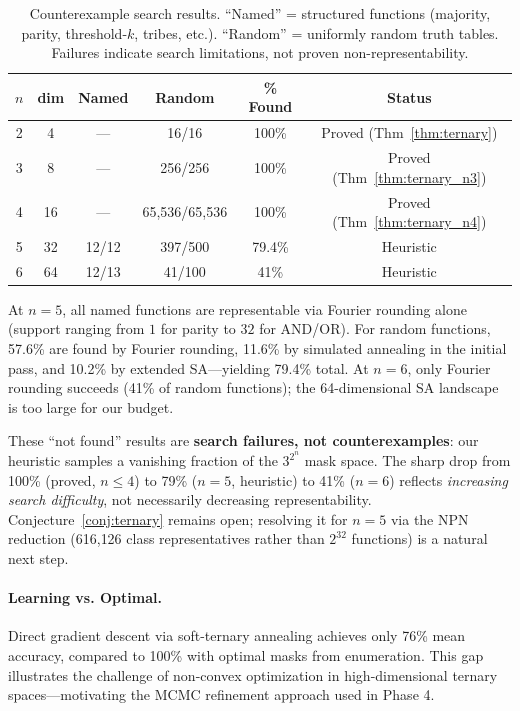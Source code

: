 \documentclass[Royal,times,sageh]{sagej}
\begin{document}
\begin{table}[h]
\centering
\caption{Counterexample search results. ``Named'' = structured functions (majority, parity, threshold-$k$, tribes, etc.). ``Random'' = uniformly random truth tables. Failures indicate search limitations, not proven non-representability.}
\label{tab:counterexample}
\small
\begin{tabular}{cccccc}
\toprule
$n$ & dim & Named & Random & \% Found & Status \\
\midrule
2 & 4 & --- & 16/16 & 100\% & Proved (Thm~\ref{thm:ternary}) \\
3 & 8 & --- & 256/256 & 100\% & Proved (Thm~\ref{thm:ternary_n3}) \\
4 & 16 & --- & 65{,}536/65{,}536 & 100\% & Proved (Thm~\ref{thm:ternary_n4}) \\
5 & 32 & 12/12 & 397/500 & 79.4\% & Heuristic \\
6 & 64 & 12/13 & 41/100 & 41\% & Heuristic \\
\bottomrule
\end{tabular}
\end{table}

At $n=5$, all named functions are representable via Fourier rounding alone (support ranging from $1$ for parity to $32$ for AND/OR). For random functions, 57.6\% are found by Fourier rounding, 11.6\% by simulated annealing in the initial pass, and 10.2\% by extended SA---yielding 79.4\% total. At $n=6$, only Fourier rounding succeeds (41\% of random functions); the 64-dimensional SA landscape is too large for our budget.

These ``not found'' results are \textbf{search failures, not counterexamples}: our heuristic samples a vanishing fraction of the $3^{2^n}$ mask space. The sharp drop from 100\% (proved, $n \leq 4$) to 79\% ($n=5$, heuristic) to 41\% ($n=6$) reflects \emph{increasing search difficulty}, not necessarily decreasing representability. Conjecture~\ref{conj:ternary} remains open; resolving it for $n=5$ via the NPN reduction (616{,}126 class representatives rather than $2^{32}$ functions) is a natural next step.

\paragraph{Learning vs. Optimal.}
Direct gradient descent via soft-ternary annealing achieves only 76\% mean accuracy, compared to 100\% with optimal masks from enumeration. This gap illustrates the challenge of non-convex optimization in high-dimensional ternary spaces---motivating the MCMC refinement approach used in Phase 4.
\end{document}
